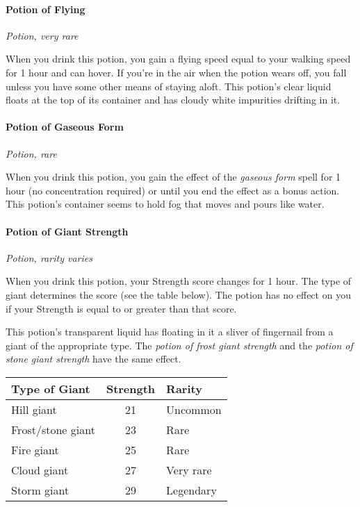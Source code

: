 \documentclass[
]{article}
\begin{document}
\hypertarget{potion-of-flying}{%
\paragraph{Potion of Flying}\label{potion-of-flying}}

\emph{Potion, very rare}

When you drink this potion, you gain a flying speed equal to your
walking speed for 1 hour and can hover. If you're in the air when the
potion wears off, you fall unless you have some other means of staying
aloft. This potion's clear liquid floats at the top of its container and
has cloudy white impurities drifting in it.

\hypertarget{potion-of-gaseous-form}{%
\paragraph{Potion of Gaseous Form}\label{potion-of-gaseous-form}}

\emph{Potion, rare}

When you drink this potion, you gain the effect of the \emph{gaseous
form} spell for 1 hour (no concentration required) or until you end the
effect as a bonus action. This potion's container seems to hold fog that
moves and pours like water.

\hypertarget{potion-of-giant-strength}{%
\paragraph{Potion of Giant Strength}\label{potion-of-giant-strength}}

\emph{Potion, rarity varies}

When you drink this potion, your Strength score changes for 1 hour. The
type of giant determines the score (see the table below). The potion has
no effect on you if your Strength is equal to or greater than that
score.

This potion's transparent liquid has floating in it a sliver of
fingernail from a giant of the appropriate type. The \emph{potion of
frost giant strength} and the \emph{potion of stone giant strength} have
the same effect.

\begin{longtable}[]{@{}lcl@{}}
\toprule
Type of Giant & Strength & Rarity\tabularnewline
\midrule
\endhead
Hill giant & 21 & Uncommon\tabularnewline
Frost/stone giant & 23 & Rare\tabularnewline
Fire giant & 25 & Rare\tabularnewline
Cloud giant & 27 & Very rare\tabularnewline
Storm giant & 29 & Legendary\tabularnewline
\bottomrule
\end{longtable}
\end{document}
